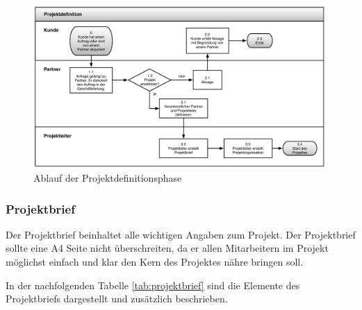 \begin{figure}[htbp]
\begin{center}
\includegraphics[width=0.99\textwidth,angle=0]{./bilder/loesung/02_01_projektdefinition.pdf}
\caption[Ablauf der Projektdefinitionsphase]{Ablauf der Projektdefinitionsphase\footnotemark}
\label{pic:02_01_projektdefinition}
\end{center}
\end{figure}

\subsubsection{Projektbrief}
Der Projektbrief beinhaltet alle wichtigen Angaben zum Projekt. Der Projektbrief 
sollte eine A4 Seite nicht überschreiten, da er allen Mitarbeitern im Projekt 
möglichst einfach und klar den Kern des Projektes nähre bringen soll.

In der nachfolgenden Tabelle \ref{tab:projektbrief} sind
die Elemente des Projektbriefs dargestellt und zusätzlich beschrieben.

